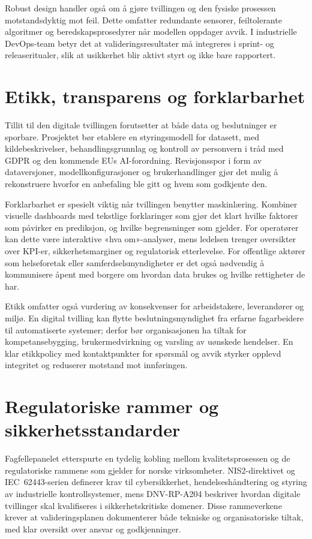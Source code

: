 Robust design handler også om å gjøre tvillingen og den fysiske prosessen motstandsdyktig mot feil. Dette omfatter redundante sensorer, feiltolerante algoritmer og beredskapsprosedyrer når modellen oppdager avvik. I industrielle DevOps-team betyr det at valideringsresultater må integreres i sprint- og releaseritualer, slik at usikkerhet blir aktivt styrt og ikke bare rapportert.

\section{Etikk, transparens og forklarbarhet}
Tillit til den digitale tvillingen forutsetter at både data og beslutninger er sporbare. Prosjektet bør etablere en styringsmodell for datasett, med kildebeskrivelser, behandlingsgrunnlag og kontroll av personvern i tråd med GDPR og den kommende EUs AI-forordning. Revisjonsspor i form av dataversjoner, modellkonfigurasjoner og brukerhandlinger gjør det mulig å rekonstruere hvorfor en anbefaling ble gitt og hvem som godkjente den.

Forklarbarhet er spesielt viktig når tvillingen benytter maskinlæring. Kombiner visuelle dashboards med tekstlige forklaringer som gjør det klart hvilke faktorer som påvirker en prediksjon, og hvilke begrensninger som gjelder. For operatører kan dette være interaktive «hva om»-analyser, mens ledelsen trenger oversikter over KPI-er, sikkerhetsmarginer og regulatorisk etterlevelse. For offentlige aktører som helseforetak eller samferdselsmyndigheter er det også nødvendig å kommunisere åpent med borgere om hvordan data brukes og hvilke rettigheter de har.

Etikk omfatter også vurdering av konsekvenser for arbeidstakere, leverandører og miljø. En digital tvilling kan flytte beslutningsmyndighet fra erfarne fagarbeidere til automatiserte systemer; derfor bør organisasjonen ha tiltak for kompetansebygging, brukermedvirkning og varsling av uønskede hendelser. En klar etikkpolicy med kontaktpunkter for spørsmål og avvik styrker opplevd integritet og reduserer motstand mot innføringen.

\section{Regulatoriske rammer og sikkerhetsstandarder}
Fagfellepanelet etterspurte en tydelig kobling mellom kvalitetsprosessen og de regulatoriske rammene som gjelder for norske virksomheter. NIS2-direktivet og IEC~62443-serien definerer krav til cybersikkerhet, hendelseshåndtering og styring av industrielle kontrollsystemer, mens DNV-RP-A204 beskriver hvordan digitale tvillinger skal kvalifiseres i sikkerhetskritiske domener.\citep{eu2022nis2,iec62443-2-1,dnv2021a204} Disse rammeverkene krever at valideringsplanen dokumenterer både tekniske og organisatoriske tiltak, med klar oversikt over ansvar og godkjenninger.

